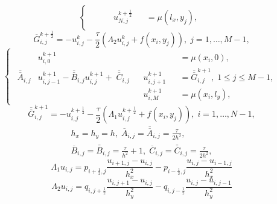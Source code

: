 \begin{itemize}
\begin{equation}
\begin{cases}
\begin{alignedat}{3}
    & && u_{N, j}^{k+\frac{1}{2}} && = \mu(l_x, y_j),
  \end{alignedat}
  \end{cases}
  \end{equation}
  \begin{equation}
    \overline{G}_{i, j}^{k+\frac{1}{2}} = -u_{i, j}^k - \frac{\tau}{2} (\Lambda_2 u_{i, j}^k + f(x_i, y_j)), \; j = 1, \ldots, M - 1,
  \end{equation}
  \begin{equation}
  \begin{cases}
  \begin{alignedat}{3}
    & u_{i, 0}^{k+1} && && = \mu(x_i, 0), \\
    \overline{\overline{A}}_{i, j} & u_{i, j-1}^{k+1} - \overline{\overline{B}}_{i, j} u_{i, j}^{k+1} + \; \overline{\overline{C}}_{i, j} && u_{i, j+1}^{k+1} && = \overline{\overline{G}}_{i, j}^{k+1}, \; 1 \leqslant j \leqslant M - 1, \\
    & && u_{i, M}^{k+1} && = \mu(x_i, l_y),
  \end{alignedat}
  \end{cases}
  \end{equation}
  \begin{equation}
    \overline{\overline{G}}_{i, j}^{k+1} = -u_{i, j}^{k + \frac{1}{2}} - \frac{\tau}{2} (\Lambda_1 u_{i, j}^{k+\frac{1}{2}} + f(x_i, y_j)), \; i = 1, \ldots, N - 1,
  \end{equation}
  \begin{equation}
  \begin{gathered}
    h_x = h_y = h, \; \overline{A}_{i, j} = \overline{\overline{A}}_{i, j} = \frac{\tau}{2 h^2}, \\
    \overline{B}_{i, j} = \overline{\overline{B}}_{i, j} = \frac{\tau}{h^2} + 1, \; \overline{C}_{i, j} = \overline{\overline{C}}_{i, j} = \frac{\tau}{2 h^2},
  \end{gathered}
  \end{equation}
  \begin{equation}
    \Lambda_1 u_{i, j} = p_{i+\frac{1}{2}, j} \frac{u_{i+1, j} - u_{i, j}}{h_x^2} - p_{i-\frac{1}{2}, j} \frac{u_{i, j} - u_{i-1, j}}{h_x^2}
  \end{equation}
  \begin{equation}
    \Lambda_2 u_{i, j} = q_{i, j+\frac{1}{2}} \frac{u_{i, j+1} - u_{i, j}}{h_y^2} - q_{i, j-\frac{1}{2}} \frac{u_{i, j} - u_{i, j-1}}{h_y^2}
  \end{equation}
  \begin{equation}

\end{equation}
\end{itemize}
